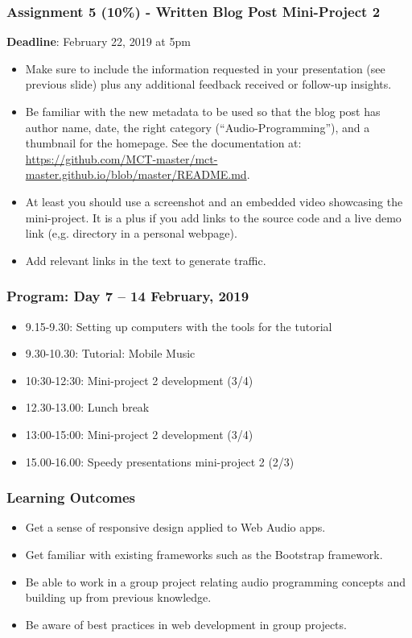 \documentclass[screen, aspectratio=43]{beamer}
\begin{document}
%
\begin{frame}
\frametitle{Assignment 5 (10\%) - Written Blog Post Mini-Project 2}
\textbf{Deadline}: February 22, 2019 at 5pm
\begin{itemize}
\item Make sure to include the information requested in your presentation (see previous slide) plus any additional feedback received or follow-up insights.
\item Be familiar with the new metadata to be used so that the blog post has author name, date, the right category (``Audio-Programming''), and a thumbnail for the homepage. See the documentation at: \url{https://github.com/MCT-master/mct-master.github.io/blob/master/README.md}.
\item At least you should use a screenshot and an embedded video showcasing the mini-project. It is a plus if you add links to the source code and a live demo link (e,g. directory in a personal webpage).
\item Add relevant links in the text to generate traffic.
\end{itemize}
\end{frame}
%
\begin{frame}
\frametitle{Program: Day 7 -- 14 February, 2019}
\begin{itemize}
\item 9.15-9.30: Setting up computers with the tools for the tutorial
\item 9.30-10.30: Tutorial: Mobile Music
\item 10:30-12:30: Mini-project 2 development (3/4)
\item 12.30-13.00: Lunch break
\item 13:00-15:00: Mini-project 2 development (3/4)
\item 15.00-16.00: Speedy presentations mini-project 2 (2/3)
\end{itemize}
\end{frame}
%
\begin{frame}
\frametitle{Learning Outcomes}
\begin{itemize}
\item Get a sense of responsive design applied to Web Audio apps.
\item Get familiar with existing frameworks such as the Bootstrap framework.
\item Be able to work in a group project relating audio programming concepts and building up from previous knowledge.
\item Be aware of best practices in web development in group projects.
\end{itemize}
\end{frame}
\end{document}
